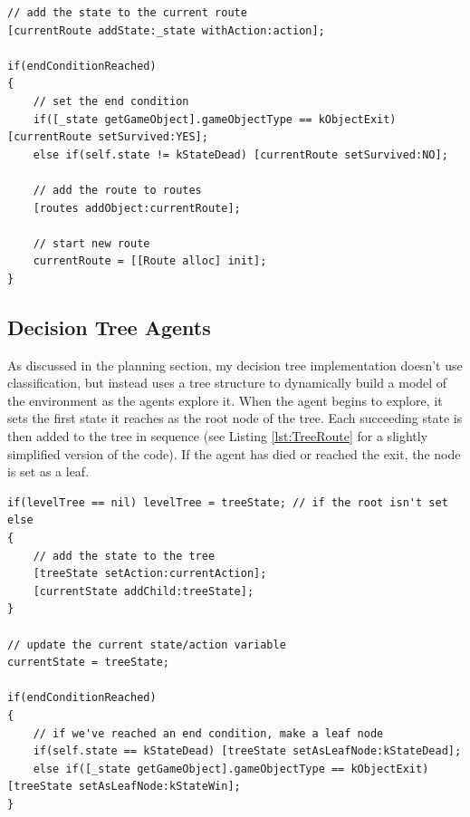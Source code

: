 \documentclass[a4paper,oneside]{report}
\begin{document}
\begin{lstlisting}[label={lst:Shortest},caption=Updating the Route]
// add the state to the current route
[currentRoute addState:_state withAction:action];
        
if(endConditionReached) 
{
    // set the end condition
    if([_state getGameObject].gameObjectType == kObjectExit) [currentRoute setSurvived:YES];
    else if(self.state != kStateDead) [currentRoute setSurvived:NO];
            
    // add the route to routes
    [routes addObject:currentRoute];
                        
    // start new route
    currentRoute = [[Route alloc] init];
}
\end{lstlisting}


\subsection{Decision Tree Agents}

As discussed in the planning section, my decision tree implementation doesn't use classification, but instead uses a tree structure to dynamically build a model of the environment as the agents explore it. When the agent begins to explore, it sets the first state it reaches as the root node of the tree. Each succeeding state is then added to the tree in sequence (see Listing \ref{lst:TreeRoute} for a slightly simplified version of the code). If the agent has died or reached the exit, the node is set as a leaf.

\begin{lstlisting}[label={lst:TreeRoute},caption=Building a Route Tree]                       
if(levelTree == nil) levelTree = treeState; // if the root isn't set
else
{
	// add the state to the tree
    [treeState setAction:currentAction];
    [currentState addChild:treeState]; 
}
            
// update the current state/action variable
currentState = treeState;
                        
if(endConditionReached)
{
    // if we've reached an end condition, make a leaf node
    if(self.state == kStateDead) [treeState setAsLeafNode:kStateDead];
    else if([_state getGameObject].gameObjectType == kObjectExit) [treeState setAsLeafNode:kStateWin];
}        
\end{lstlisting}
\end{document}
